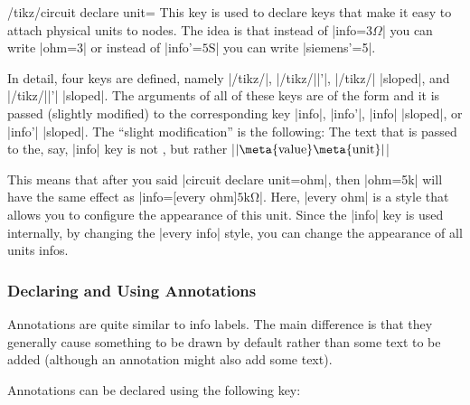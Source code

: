 \begin{key}{/tikz/circuit declare unit=}
    This key is used to declare keys that make it easy to attach physical units
    to nodes. The idea is that instead of |info=$3\Omega$| you can write
    |ohm=3| or instead of |info'=$5\mathrm{S}$| you can write |siemens'=5|.

    In detail, four keys are defined, namely |/tikz/|,
    |/tikz/||'|, |/tikz/| |sloped|, and
    |/tikz/||'| |sloped|. The arguments of all of these keys are of
    the form  and it is
    passed (slightly modified) to the corresponding key |info|, |info'|, |info|
    |sloped|, or |info'| |sloped|. The ``slight modification'' is the
    following: The text that is passed to the, say, |info| key is not
    , but rather |$\mathrm{|\meta{value}\meta{unit}|}$|

    This means that after you said |circuit declare unit={ohm}{\Omega}|, then
    |ohm=5k| will have the same effect as
    |info={[every ohm]$\mathrm{5k\Omega}$}|. Here, |every ohm| is a style that
    allows you to configure the appearance of this unit. Since the |info| key
    is used internally, by changing the |every info| style, you can change the
    appearance of all units infos.
\begin{codeexample}[preamble={\usetikzlibrary{circuits.ee.IEC}}]
\end{codeexample}
\end{key}


\subsubsection{Declaring and Using Annotations}

Annotations are quite similar to info labels. The main difference is that they
generally cause something to be drawn by default rather than some text to be
added (although an annotation might also add some text).

Annotations can be declared using the following key:


